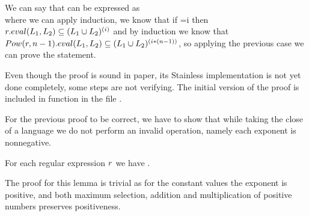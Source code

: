 We can say that  can be expressed as \\  where we can apply induction, we know that if =i then $r.eval(L_{1}, L_{2})\subseteq (L_{1} \cup L_{2})^{(i)}$ and by induction we know that $Pow(r,n-1).eval(L_{1}, L_{2})\subseteq (L_{1} \cup L_{2})^{(i * (n-1))}$, so applying the previous case we can prove the statement.

Even though the proof is sound in paper, its Stainless implementation is not yet done completely, some steps are not verifying. The initial version of the proof is included in function  in the file .

For the previous proof to be correct, we have to show that while taking the close of a language we do not perform an invalid operation, namely each exponent is nonnegative.

\begin{lemma}
	\label{lem:evalExpPositive}
	For each regular expression $r$ we have .
\end{lemma}

The proof for this lemma is trivial as for the constant values the exponent is positive, and both maximum selection, addition and multiplication of positive numbers preserves positiveness.
